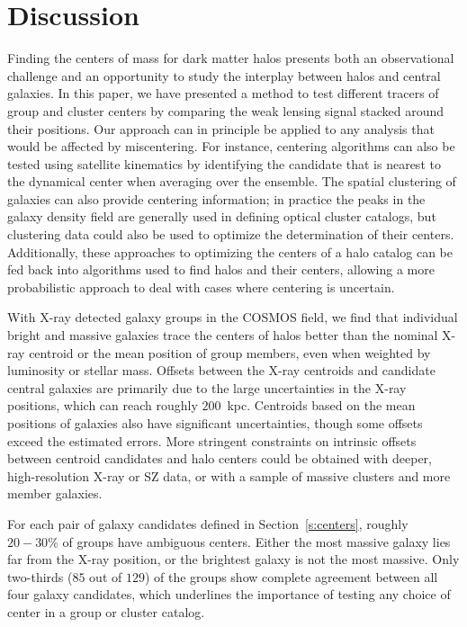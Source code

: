 \documentclass[12pt]{emulateapj}
\begin{document}

\section{Discussion}
\label{s:discussion}

Finding the centers of mass for dark matter halos presents both an
observational challenge and an 
opportunity to study the interplay between halos and central
galaxies. In this paper, we have presented a method to test different
tracers of group and cluster centers by comparing the weak lensing
signal stacked around their positions. Our approach can in principle
be applied to any analysis that would be affected by miscentering. For
instance, centering algorithms can also be tested using satellite
kinematics by
identifying the candidate that is nearest to the dynamical center when
averaging over the ensemble. The spatial clustering of galaxies can
also provide centering information; in practice the peaks in the
galaxy density field are generally used in defining optical cluster
catalogs, but clustering data could also be used to optimize the
determination of their centers. Additionally, these approaches to
optimizing the centers of a halo catalog can be fed back into
algorithms used to find halos and their centers, allowing a more
probabilistic approach to deal with cases where centering is uncertain.

With X-ray detected galaxy groups in the COSMOS field, we find that individual
bright and massive galaxies trace the centers of halos better than the
nominal X-ray centroid or the mean position of group members, even
when weighted by luminosity or stellar mass. Offsets between the X-ray
centroids and candidate central galaxies are primarily due to
the large uncertainties in the X-ray positions,
which can reach roughly $200$~{\rm kpc}. Centroids based on the mean
positions of galaxies also have significant uncertainties, though some
offsets exceed the estimated errors. More stringent constraints on
intrinsic offsets between centroid candidates and halo centers could
be obtained with deeper, high-resolution X-ray or SZ data, or with a
sample of massive clusters and more member galaxies.

For each pair of galaxy candidates defined in Section~\ref{s:centers},
roughly $20-30\%$ of groups have ambiguous centers. Either the most
massive galaxy lies far from the X-ray position, or the brightest
galaxy is not the most massive. Only two-thirds ($85$ out of $129$) of the
groups show complete agreement between all four galaxy candidates,
which underlines the importance of testing any choice of center in a group
or cluster catalog.
\end{document}

